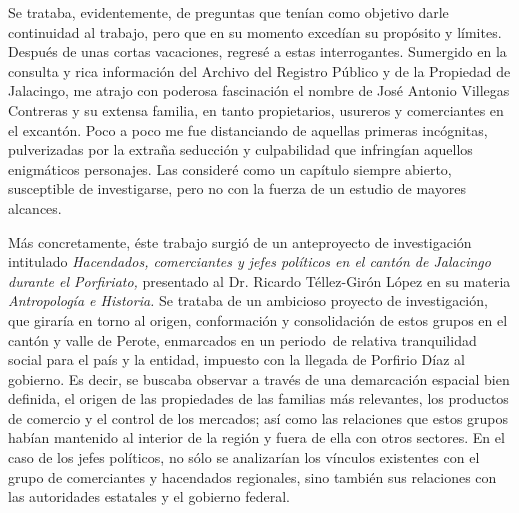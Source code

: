 \documentclass[14pt,twoside,final]{extbook} %
\begin{document}
Se trataba, evidentemente, de preguntas que tenían como objetivo darle continuidad al trabajo, pero que en su momento excedían su propósito y límites. Después de unas cortas vacaciones, regresé a estas interrogantes. Sumergido en la consulta y rica información del Archivo del Registro Público y de la Propiedad de Jalacingo, me atrajo con poderosa fascinación el nombre de José Antonio Villegas Contreras y su extensa familia, en tanto propietarios, usureros y comerciantes en el excantón. Poco a poco me fue distanciando de aquellas primeras incógnitas, pulverizadas por la extraña seducción y culpabilidad que infringían aquellos enigmáticos personajes. Las consideré como un capítulo siempre abierto, susceptible de investigarse, pero no con la fuerza de un estudio de mayores alcances.

Más concretamente, éste trabajo surgió de un anteproyecto de investigación intitulado \emph{Hacendados, comerciantes y jefes políticos en el cantón de Jalacingo durante el Porfiriato,} presentado al Dr. Ricardo Téllez-Girón López en su materia \emph{Antropología e Historia.} Se trataba de un ambicioso proyecto de investigación, que giraría en torno al origen, conformación y consolidación de estos grupos en el cantón y valle de Perote, enmarcados en un periodo~de relativa tranquilidad social para el país y la entidad, impuesto con la llegada de Porfirio Díaz al gobierno. Es decir, se buscaba observar a través de una demarcación espacial bien definida, el origen de las propiedades de las familias más relevantes, los productos de comercio y el control de los mercados; así como las relaciones que estos grupos habían mantenido al interior de la región y fuera de ella con otros sectores. En el caso de los jefes políticos, no sólo se analizarían los vínculos existentes con el grupo de comerciantes y hacendados regionales, sino también sus relaciones con las autoridades estatales y el gobierno federal.
\end{document}

